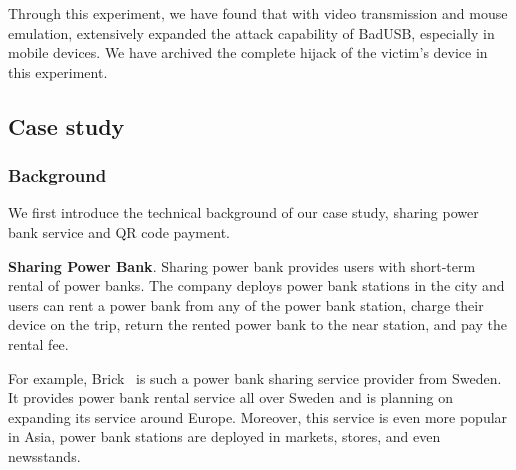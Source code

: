 Through this experiment, we have found that with video transmission and mouse
emulation, \tool extensively expanded the attack capability of BadUSB,
especially in mobile devices. We have archived the complete hijack of the victim's
device in this experiment.

\subsection{Case study}
\label{subsec:case_study}
\subsubsection{Background}

We first introduce the technical background of our case study, sharing power
bank service and QR code payment.

\textbf{Sharing Power Bank}.  Sharing power bank provides users with short-term
rental of power banks.  The company deploys power bank stations in the city and
users can rent a power bank from any of the power bank station, charge their
device on the trip, return the rented power bank to the near station, and pay
the rental fee.

For example, Brick~\cite{Brick} is such a power bank sharing service
provider from Sweden. It provides power bank rental service all over Sweden
and is planning on expanding its service around Europe. Moreover, this
service is even more popular in Asia, power bank stations are deployed in
markets, stores, and even newsstands.

